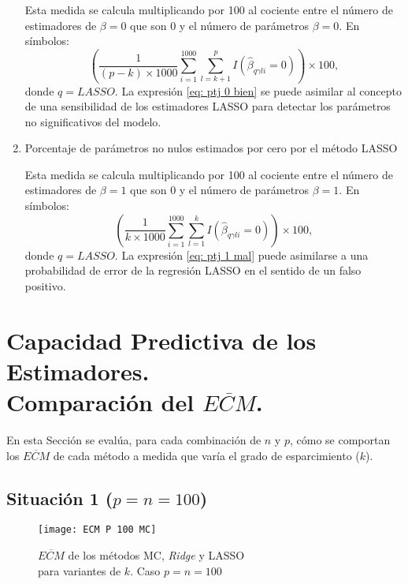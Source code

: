 \documentclass[a4paper,12pt]{report}
\begin{document}
\begin{enumerate}
Esta medida se calcula multiplicando por 100 al cociente entre el número de estimadores de $\beta=0$ que son 0 y el número de parámetros $\beta=0$. En símbolos:
\begin{equation}
\label{eq: ptj 0 bien}
\left(\dfrac{1}{(p-k) \times 1000}\sum_{i=1}^{1000}\sum_{l=k+1}^p I(\hat{\beta}_{q\gamma li} = 0)\right)\times 100,
\end{equation}
donde $q = LASSO$. La expresión \ref{eq: ptj 0 bien} se puede asimilar al concepto de una sensibilidad de los estimadores LASSO para detectar los parámetros no significativos del modelo.

\item Porcentaje de parámetros no nulos estimados por cero por el método LASSO 

Esta medida se calcula multiplicando por 100 al cociente entre el número de estimadores de $\beta=1$ que son 0 y el número de parámetros $\beta=1$. En símbolos:
\begin{equation}
\label{eq: ptj 1 mal}
\left(\dfrac{1}{k \times 1000}\sum_{i=1}^{1000}\sum_{l=1}^k I(\hat{\beta}_{q\gamma li} = 0)\right)\times 100,
\end{equation}
donde $q=LASSO$. La expresión \ref{eq: ptj 1 mal} puede asimilarse a una probabilidad de error de la regresión LASSO en el sentido de un falso positivo.
\end{enumerate}

\newpage

{
\section[Capacidad Predictiva de los Estimadores. Comparación del $\overline{ECM}$]{Capacidad Predictiva de los Estimadores. \\ Comparación del $\overline{ECM}$.}
}

En esta Sección se evalúa, para cada combinación de $n$ y $p$, cómo se comportan los $\overline{ECM}$ de cada método a medida que varía el grado de esparcimiento ($k$).

\subsection*{Situación 1 ($p=n=100$)}

\begin{figure}[H]
	\centering
	\texttt{[image: ECM P 100 MC]}
	\caption{$\overline{ECM}$ de los métodos MC, \textit{Ridge} y LASSO \\ para variantes de $k$. Caso $p=n=100$}
	\label{fig: ECM P100 MC}
\end{figure}
\end{document}
